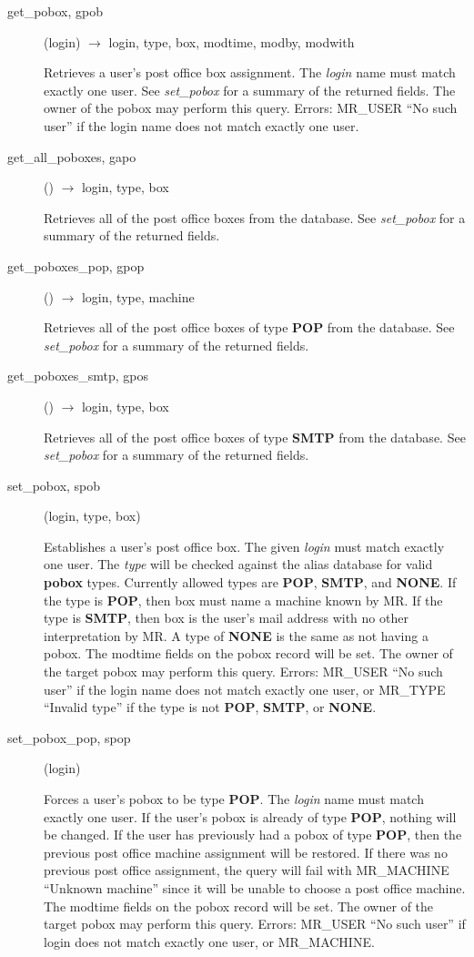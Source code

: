 \documentclass{article}
\begin{document}
\begin{description}
\item[get\_pobox, gpob](login) $\rightarrow$ login, type, box, modtime,
modby, modwith

Retrieves a user's post office box assignment. The {\em login} name
must match exactly one user. See {\em set\_pobox} for a summary of the
returned fields. The owner of the pobox may perform this query.
Errors: MR\_USER ``No such user'' if the login name does not match
exactly one user.

\item[get\_all\_poboxes, gapo]() $\rightarrow$ login, type, box

Retrieves all of the post office boxes from the database.  See
{\em set\_pobox} for a summary of the returned fields.

\item[get\_poboxes\_pop, gpop]() $\rightarrow$ login, type, machine

Retrieves all of the post office boxes of type {\bf POP} from the
database.  See {\em set\_pobox} for a summary of the returned fields.

\item[get\_poboxes\_smtp, gpos]() $\rightarrow$ login, type, box

Retrieves all of the post office boxes of type {\bf SMTP} from the
database.  See {\em set\_pobox} for a summary of the returned fields.

\item[set\_pobox, spob](login, type, box)

Establishes a user's post office box.  The given {\em login} must match
exactly one user.  The {\em type} will be checked against the alias
database for valid {\bf pobox} types.  Currently allowed types are
{\bf POP}, {\bf SMTP}, and {\bf NONE}.  If the type is {\bf POP}, then box
must name a machine known by MR.  If the type is {\bf SMTP}, then box
is the user's mail address with no other interpretation by MR.  A
type of {\bf NONE} is the same as not having a pobox.  The modtime
fields on the pobox record will be set.  The owner of the target pobox
may perform this query.  Errors: MR\_USER ``No such user'' if the login
name does not match exactly one user, or MR\_TYPE ``Invalid type'' if
the type is not {\bf POP}, {\bf SMTP}, or {\bf NONE}.

\item[set\_pobox\_pop, spop](login)

Forces a user's pobox to be type {\bf POP}.  The {\em login} name must
match exactly one user.  If the user's pobox is already of type
{\bf POP}, nothing will be changed.  If the user has previously had a
pobox of type {\bf POP}, then the previous post office machine
assignment will be restored.  If there was no previous post office
assignment, the query will fail with MR\_MACHINE ``Unknown machine''
since it will be unable to choose a post office machine.  The modtime
fields on the pobox record will be set.  The owner of the target pobox
may perform this query.  Errors: MR\_USER ``No such user'' if login does
not match exactly one user, or MR\_MACHINE.


\end{description}
\end{document}

